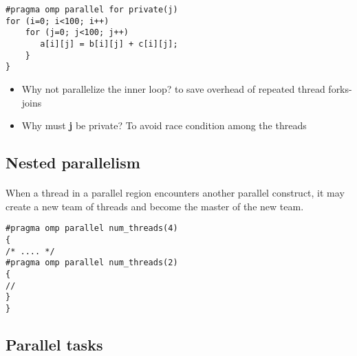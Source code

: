 \noindent







\begin{verbatim}
#pragma omp parallel for private(j)
for (i=0; i<100; i++)
    for (j=0; j<100; j++)
       a[i][j] = b[i][j] + c[i][j];
    }
}

\end{verbatim}


\begin{itemize}
\item Why not parallelize the inner loop? to save overhead of repeated thread forks-joins

\item Why must \textbf{j} be private? To avoid race condition among the threads
\end{itemize}

\noindent



\subsection*{Nested parallelism}

\paragraph{}
When a thread in a parallel region encounters another parallel construct, it
may create a new team of threads and become the master of the new
team.









\begin{verbatim}
#pragma omp parallel num_threads(4)
{
/* .... */
#pragma omp parallel num_threads(2)
{
//  
}
}

\end{verbatim}



\subsection*{Parallel tasks}

